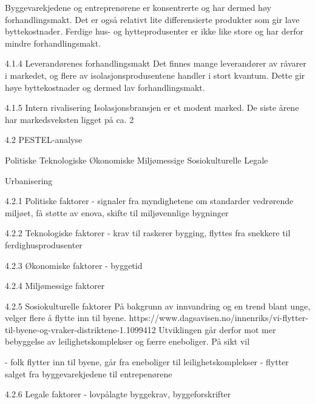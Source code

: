Byggevarekjedene og entreprenørene er konsentrerte og har dermed høy forhandlingsmakt. Det er også relativt lite differensierte produkter som gir lave byttekostnader. Ferdige hus- og hytteprodusenter er ikke like store og har derfor mindre forhandlingsmakt. 

4.1.4 Leverandørenes forhandlingsmakt
Det finnes mange leverandører av råvarer i markedet, og flere av isolasjonsprodusentene handler i stort kvantum. Dette gir høye byttekostnader og dermed lav forhandlingsmakt.

4.1.5 Intern rivalisering
Isolasjonsbransjen er et modent marked. De siste årene har markedsveksten ligget på ca. 2%

4.2 PESTEL-analyse


Politiske
Teknologiske
Økonomiske
Miljømessige
Sosiokulturelle
Legale








Urbanisering




4.2.1 Politiske faktorer - signaler fra myndighetene om standarder vedrørende miljøet, få støtte av enova, skifte til miljøvennlige bygninger

4.2.2 Teknologiske faktorer - krav til raskerer bygging, flyttes fra snekkere til ferdighusprodusenter 

4.2.3 Økonomiske faktorer - byggetid

4.2.4 Miljømessige faktorer

4.2.5 Sosiokulturelle faktorer 
På bakgrunn av innvandring og en trend blant unge, velger flere å flytte inn til byene. https://www.dagsavisen.no/innenriks/vi-flytter-til-byene-og-vraker-distriktene-1.1099412
Utviklingen går derfor mot mer bebyggelse av leilighetskomplekser og færre eneboliger. På sikt vil 

- folk flytter inn til byene, går fra eneboliger til leilighetskomplekser - flytter salget fra byggevarekjedene til entrepenørene

4.2.6 Legale faktorer - lovpålagte byggekrav, byggeforskrifter

